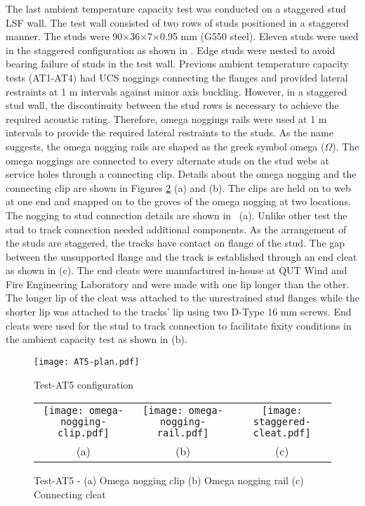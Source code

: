 The last ambient temperature capacity test was conducted on a staggered stud LSF wall. The test wall consisted of two rows of studs positioned in a staggered manner. The studs were 90$\times$36$\times$7$\times$0.95 mm (G550 steel). Eleven studs were used in the staggered configuration as shown in . Edge studs were nested to avoid bearing failure of studs in the test wall. Previous ambient temperature capacity tests (AT1-AT4) had UCS noggings connecting the flanges and provided lateral restraints at 1 m intervals against minor axis buckling. However, in a staggered stud wall, the discontinuity between the stud rows is necessary to achieve the required acoustic rating. Therefore, omega noggings rails were used at 1 m intervals to provide the required lateral restraints to the studs. As the name suggests, the omega nogging rails are shaped as the greek symbol omega ($\Omega$). The omega noggings are connected to every alternate studs on the stud webs at service holes through a connecting clip. Details about the omega nogging and the connecting clip are shown in Figures \ref{fig:Omega-nogging-connections} (a) and (b). The clips are held on to web at one end and snapped on to the groves of the omega nogging at two locations. The nogging to stud connection details are shown in ~(a). Unlike other test the stud to track connection needed additional components. As the arrangement of the studs are staggered, the tracks have contact on flange of the stud. The gap between the unsupported flange and the track is established through an end cleat as shown in  (c). The end cleats were manufactured in-house at QUT Wind and Fire Engineering Laboratory and were made with one lip longer than the other. The longer lip of the cleat was attached to the unrestrained stud flanges while the shorter lip was attached to the tracks' lip using two D-Type 16 mm screws. End cleats were used for the stud to track connection to facilitate fixity conditions in the ambient capacity test as shown in  (b). 
\begin{figure}[!htbp]
	\centering
			\texttt{[image: AT5-plan.pdf]}\\
		\caption{Test-AT5 configuration}
		\label{fig:AT5-plan}
\end{figure}
\begin{figure}[!htbp]
	\centering
		\begin{tabular}{ccc}
			\texttt{[image: omega-nogging-clip.pdf]} & 
			\texttt{[image: omega-nogging-rail.pdf]} & 
			\texttt{[image: staggered-cleat.pdf]} \\
			(a) & (b) & (c) \\ 
		\end{tabular} 
		\caption{Test-AT5 - (a) Omega nogging clip (b) Omega nogging rail (c) Connecting cleat}
		\label{fig:Omega-nogging-connections}
\end{figure}
